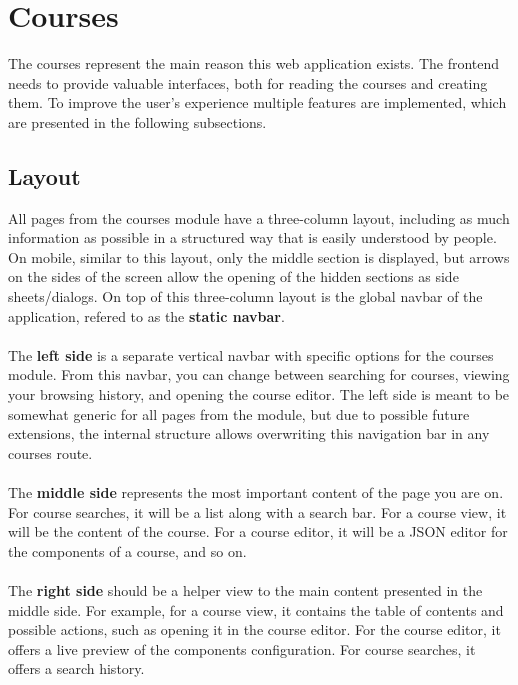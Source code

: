 \section{Courses}

The courses represent the main reason this web application exists. The frontend needs to provide valuable interfaces, both for reading the courses and creating them. To improve the user's experience multiple features are implemented, which are presented in the following subsections.

\subsection{Layout}

\noindent All pages from the courses module have a three-column layout, including as much information as possible in a structured way that is easily understood by people. On mobile, similar to this layout, only the middle section is displayed, but arrows on the sides of the screen allow the opening of the hidden sections as side sheets/dialogs. On top of this three-column layout is the global navbar of the application, refered to as the \textbf{static navbar}.
\\\\
\noindent The \textbf{left side} is a separate vertical navbar with specific options for the courses module. From this navbar, you can change between searching for courses, viewing your browsing history, and opening the course editor. The left side is meant to be somewhat generic for all pages from the module, but due to possible future extensions, the internal structure allows overwriting this navigation bar in any courses route.
\\\\
\noindent The \textbf{middle side} represents the most important content of the page you are on. For course searches, it will be a list along with a search bar. For a course view, it will be the content of the course. For a course editor, it will be a JSON editor for the components of a course, and so on.
\\\\
\noindent The \textbf{right side} should be a helper view to the main content presented in the middle side. For example, for a course view, it contains the table of contents and possible actions, such as opening it in the course editor. For the course editor, it offers a live preview of the components configuration. For course searches, it offers a search history.
\\\\
